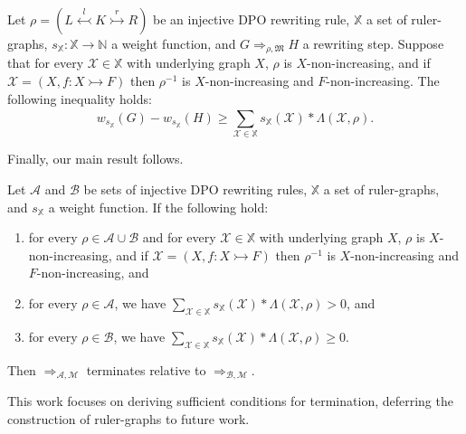 \begin{lemma}
    \label{antipattern:lem:w_g_geq_w_h_leq}
    Let $\rho \mathop{=} (L \overset{l}{\leftarrowtail} K \overset{r}{\rightarrowtail} R)$ be an injective DPO rewriting rule,
    \( \mathbb{X} \) a set of ruler-graphs,
    \( s_{\mathbb{X}} \mathop{\colon} \mathbb{X} \mathop{\to} \mathbb{N} \) a weight function,
    and \( G \mathop{\Rightarrow}_{\rho,\mathfrak{M}} H \) a rewriting step. 
    Suppose that for every \( \mathcal{X} \mathop{\in} \mathbb{X} \) with underlying graph $X$, 
    $\rho$ is $X$-non-increasing, and if $\mathcal{X}= (X,f:X \rightarrowtail F)$ then $\rho^{-1}$ is $X$-non-increasing and $F$-non-increasing. The following inequality holds:
     $$
        w_{s_\mathbb{X}}(G) \mathop{-} w_{s_\mathbb{X}}(H) 
        \mathop{\geq} 
        \sum_{\mathcal{X} \mathop{\in} \mathbb{X}}^{}s_\mathbb{X}(\mathcal{X}) \mathop{*} \Lambda(\mathcal{X},\rho).
    $$
\end{lemma}
Finally, our main result follows.
\begin{theorem}[Termination] 
    \label{antipattern:thm:termination_grs} 
    Let \(\mathcal{A}\) and \(\mathcal{B}\) be sets of injective DPO rewriting rules, $\mathbb{X}$ a set of ruler-graphs, and $s_\mathbb{X}$ a weight function. If the following hold:
    \begin{enumerate}
        \item  for every $\rho \mathop{\in} \mathcal{A} \mathop{\cup} \mathcal{B}$ and for every \( \mathcal{X} \mathop{\in} \mathbb{X} \) with underlying graph $X$, 
        $\rho$ is $X$-non-increasing, and if $\mathcal{X}= (X,f:X \rightarrowtail F)$ then $\rho^{-1}$ is $X$-non-increasing and $F$-non-increasing, and
        \item for every \(\rho \mathop{\in} \mathcal{A}\), we have
        $ \sum_{\mathcal{X} \mathop{\in} \mathbb{X}}^{}s_\mathbb{X}(\mathcal{X}) \mathop{*} 
            \Lambda(\mathcal{X},\rho) \mathop{>} 0 $, and
        \item for every \(\rho \mathop{\in} \mathcal{B}\), we have   
        $ 
            \sum_{\mathcal{X} \mathop{\in} \mathbb{X}}^{}s_\mathbb{X}(\mathcal{X}) \mathop{*} \Lambda(\mathcal{X},\rho) \mathop{\geq} 0 
        $.
    \end{enumerate}
    Then \(\mathop{\Rightarrow}_{\mathcal{A},\mathcal{M}}\) terminates relative to \(\mathop{\Rightarrow}_{\mathcal{B},\mathcal{M}}\).
\end{theorem}
\begin{remark}
    This work focuses on deriving sufficient conditions for termination, deferring the construction of ruler-graphs to future work.
\end{remark} 
